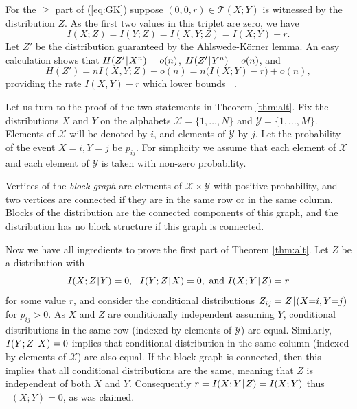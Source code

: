\documentclass{IEEEtran}
\newcommand\T{\mathcal{T}}
\DeclareMathOperator\GK{C_{\mathsf{GK}}}
\newcommand\I{I\xspace}
\renewcommand\H{H\xspace}
\def\|{\mkern 1.4mu\mathord{|}\mkern 1.4mu}
\renewcommand{\ge}{\geqslant}
\begin{document}
For the $\ge$ part of (\ref{eq:GK}) suppose $(0,0,r)\in \T(X;Y)$ is
witnessed by the distribution $Z$. As the first two values in this triplet
are zero, we have
$$
  \I(X;Z)=\I(Y;Z)=\I(X,Y;Z)=\I(X;Y)-r.
$$
Let $Z'$ be the distribution guaranteed by the Ahlswede-K\"orner lemma. An
easy calculation shows that $\H(Z'\|X^n)=o(n)$, $\H(Z'\|Y^n)=o(n)$, and
$$
   \H(Z')=n\I(X,Y;Z)+o(n)= n\big(\I(X;Y)-r\big)+o(n),
$$
providing the rate $\I(X,Y)-r$ which lower bounds $\GK$.

\medskip

Let us turn to the proof of the two statements in Theorem \ref{thm:alt}.
Fix the distributions $X$ and $Y$ on the alphabets $\mathcal
X=\{1,\dots,N\}$ and $\mathcal Y=\{1,\dots, M\}$. Elements of $\mathcal X$
will be denoted by $i$, and elements of $\mathcal Y$ by $j$. Let the probability
of the event $X{=}i, Y{=}j$ be $p_{ij}$. For simplicity we assume that each
element of $\mathcal X$ and each element of $\mathcal Y$ is taken with
non-zero probability.

Vertices of the \emph{block graph} are elements of $\mathcal X \times \mathcal
Y$ with positive probability, and two vertices are connected if they are in
the same row or in the same column. Blocks of the distribution are the
connected components of this graph, and the distribution has no block
structure if this graph is connected.

Now we have all ingredients to prove the first part of Theorem \ref{thm:alt}.
Let $Z$ be a distribution with
$$
   \I(X;Z\|Y)=0, ~~\I(Y;Z\|X)=0, \mbox{ and } \I(X;Y\|Z)=r
$$
for some value $r$, and consider the conditional distributions $Z_{ij} = Z
\|(X{=}i,Y{=}j)$ for $p_{ij}>0$. As $X$ and $Z$ are conditionally
independent assuming $Y$, conditional distributions in the same row (indexed
by elements of $\mathcal Y$) are equal. Similarly, $\I(Y;Z\|X)=0$ implies
that conditional distribution in the same column (indexed by elements of
$\mathcal X$) are also equal. If the block graph is connected, then this implies
that all conditional distributions are the same, meaning that $Z$ is
independent of both $X$ and $Y$. Consequently $r=\I(X;Y\|Z)=\I(X;Y)$ thus
$\GK(X;Y)=0$, as was claimed.
\end{document}

